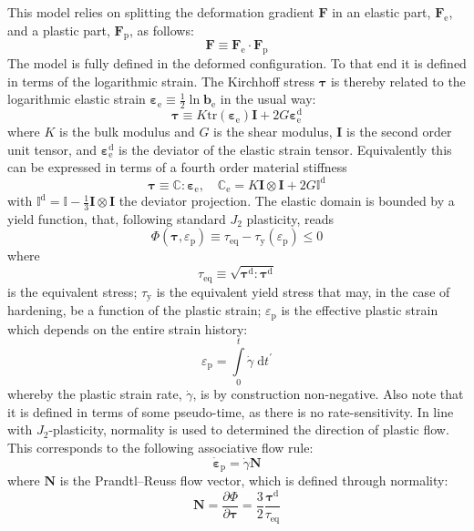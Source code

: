 \documentclass[garamond]{goose-article}
\newcommand\T[1]{\bm{{#1}}}
\newcommand\TT[1]{\mathbb{{#1}}}
\begin{document}
This model relies on splitting the deformation gradient $\T{F}$ in an elastic part, $\T{F}_\mathrm{e}$, and a plastic part, $\T{F}_\mathrm{p}$, as follows:
\begin{equation}
  \T{F} \equiv \T{F}_\mathrm{e} \cdot \T{F}_\mathrm{p}
\end{equation}
The model is fully defined in the deformed configuration. To that end it is defined in terms of the logarithmic strain. The Kirchhoff stress $\T{\tau}$ is thereby related to the logarithmic elastic strain $\T{\varepsilon}_\mathrm{e} \equiv \tfrac{1}{2} \ln \T{b}_\mathrm{e}$ in the usual way:
\begin{equation}
  \T{\tau} \equiv K \mathrm{tr} \left( \T{\varepsilon}_\mathrm{e} \right) \T{I} + 2 G \T{\varepsilon}_\mathrm{e}^\mathrm{d}
\end{equation}
where $K$ is the bulk modulus and $G$ is the shear modulus, $\T{I}$ is the second order unit tensor, and $\T{\varepsilon}_\mathrm{e}^\mathrm{d}$ is the deviator of the elastic strain tensor. Equivalently this can be expressed in terms of a fourth order material stiffness
\begin{equation}
  \T{\tau} \equiv \TT{C} : \T{\varepsilon}_\mathrm{e},
  \quad
  \TT{C}_\mathrm{e} = K \T{I} \otimes \T{I} + 2 G \TT{I}^\mathrm{d}
  \label{eq:tangent:elas}
\end{equation}
with $\TT{I}^\mathrm{d} = \TT{I} - \tfrac{1}{3} \T{I} \otimes \T{I}$ the deviator projection. The elastic domain is bounded by a yield function, that, following standard $J_2$ plasticity, reads
\begin{equation}
  \Phi(\T{\tau}, \varepsilon_\mathrm{p}) \equiv \tau_\mathrm{eq} - \tau_\mathrm{y}(\varepsilon_\mathrm{p}) \leq 0
\end{equation}
where
\begin{equation}
  \tau_\mathrm{eq} \equiv \sqrt{ \T{\tau}^\mathrm{d} : \T{\tau}^\mathrm{d} }
\end{equation}
is the equivalent stress; $\tau_\mathrm{y}$ is the equivalent yield stress that may, in the case of hardening, be a function of the plastic strain; $\varepsilon_\mathrm{p}$ is the effective plastic strain which depends on the entire strain history:
\begin{equation}
  \varepsilon_\mathrm{p} = \int\limits_0^t \dot{\gamma} \;\mathrm{d}t^\prime
  \label{eq:history}
\end{equation}
whereby the plastic strain rate, $\dot{\gamma}$, is by construction non-negative. Also note that it is defined in terms of some pseudo-time, as there is no rate-sensitivity. In line with $J_2$-plasticity, normality is used to determined the direction of plastic flow. This corresponds to the following associative flow rule:
\begin{equation}
  \dot{\bm{\varepsilon}}_\mathrm{p} = \dot{\gamma} \bm{N}
  \label{eq:flow-rule}
\end{equation}
where $\bm{N}$ is the Prandtl--Reuss flow vector, which is defined through normality:
\begin{equation}
  \bm{N}
  = \frac{\partial \Phi}{\partial \T{\tau}}
  = \frac{3}{2} \frac{\T{\tau}^\mathrm{d}}{\tau_\mathrm{eq}}
\end{equation}
\end{document}
